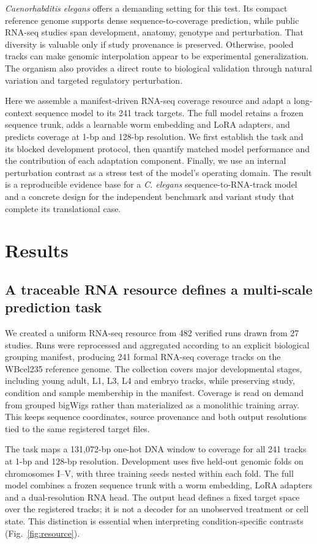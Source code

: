 \documentclass[pdflatex,sn-nature]{sn-jnl}
\begin{document}
\textit{Caenorhabditis elegans} offers a demanding setting for this test. Its compact reference genome supports dense sequence-to-coverage prediction, while public RNA-seq studies span development, anatomy, genotype and perturbation. That diversity is valuable only if study provenance is preserved. Otherwise, pooled tracks can make genomic interpolation appear to be experimental generalization. The organism also provides a direct route to biological validation through natural variation and targeted regulatory perturbation.

Here we assemble a manifest-driven RNA-seq coverage resource and adapt a long-context sequence model to its 241 track targets. The full model retains a frozen sequence trunk, adds a learnable worm embedding and LoRA adapters, and predicts coverage at 1-bp and 128-bp resolution. We first establish the task and its blocked development protocol, then quantify matched model performance and the contribution of each adaptation component. Finally, we use an internal perturbation contrast as a stress test of the model's operating domain. The result is a reproducible evidence base for a \textit{C. elegans} sequence-to-RNA-track model and a concrete design for the independent benchmark and variant study that complete its translational case.

\section{Results}

\subsection{A traceable RNA resource defines a multi-scale prediction task}

We created a uniform RNA-seq resource from 482 verified runs drawn from 27 studies. Runs were reprocessed and aggregated according to an explicit biological grouping manifest, producing 241 formal RNA-seq coverage tracks on the WBcel235 reference genome. The collection covers major developmental stages, including young adult, L1, L3, L4 and embryo tracks, while preserving study, condition and sample membership in the manifest. Coverage is read on demand from grouped bigWigs rather than materialized as a monolithic training array. This keeps sequence coordinates, source provenance and both output resolutions tied to the same registered target files.

The task maps a 131,072-bp one-hot DNA window to coverage for all 241 tracks at 1-bp and 128-bp resolution. Development uses five held-out genomic folds on chromosomes I--V, with three training seeds nested within each fold. The full model combines a frozen sequence trunk with a worm embedding, LoRA adapters and a dual-resolution RNA head. The output head defines a fixed target space over the registered tracks; it is not a decoder for an unobserved treatment or cell state. This distinction is essential when interpreting condition-specific contrasts (Fig.~\ref{fig:resource}).
\end{document}
